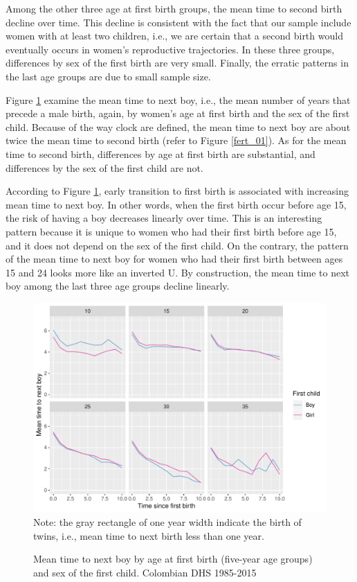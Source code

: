 \documentclass{article}
\begin{document}
Among the other three age at first birth groups, the mean time to second birth decline over time. This decline is consistent with the fact that our sample include women with at least two children, i.e., we are certain that a second birth would eventually occurs in women's reproductive trajectories. In these three groups, differences by sex of the first birth are very small. Finally, the erratic patterns in the last age groups are due to small sample size.

Figure \ref{fert_02} examine the mean time to next boy, i.e., the mean number of years that precede a male birth, again, by women's age at first birth and the sex of the first child. Because of the way clock are defined, the mean time to next boy are about twice the mean time to second birth (refer to Figure \ref{fert_01}). As for the mean time to second birth, differences by age at first birth are substantial, and differences by the sex of the first child are not.

According to Figure \ref{fert_02}, early transition to first birth is associated with increasing mean time to next boy. In other words, when the first birth occur before age 15, the risk of having a boy decreases linearly over time. This is an interesting pattern because it is unique to women who had their first birth before age 15, and it does not depend on the sex of the first child. On the contrary, the pattern of the mean time to next boy for women who had their first birth between ages 15 and 24 looks more like an inverted U. By construction, the mean time to next boy among the last three age groups decline linearly.

\begin{figure}[H]
 \centering
    \caption{Mean time to next boy by age at first birth (five-year age groups) and sex of the first child. Colombian DHS 1985-2015}
    \includegraphics[scale=0.8]{Figures/mt_second_boy_by_sex_first_cohort.pdf}\\
    \label{fert_02}
    Note: the gray rectangle of one year width indicate the birth of twins, i.e., mean time to next birth less than one year.
\end{figure}
\end{document}
